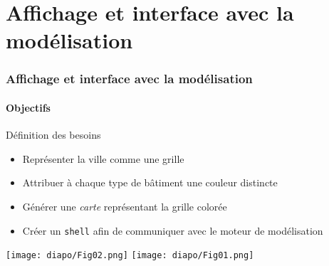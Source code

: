 \section[Modélisation visuelle]{Affichage et interface avec la modélisation}

\begin{frame}
	\frametitle{Affichage et interface avec la modélisation}
	\framesubtitle{Objectifs}

	\begin{block}{Définition des besoins}
        \pause
		
		\begin{itemize}
		    \item Représenter la ville comme une grille
                \item Attribuer à chaque type de bâtiment une couleur distincte
                \item Générer une \textit{carte} représentant la grille colorée
                \item Créer un \texttt{shell} afin de communiquer avec le moteur de modélisation
		\end{itemize}
	\end{block}
    \begin{center}
        \texttt{[image: diapo/Fig02.png]}
        \texttt{[image: diapo/Fig01.png]}
    \end{center}
\end{frame}


